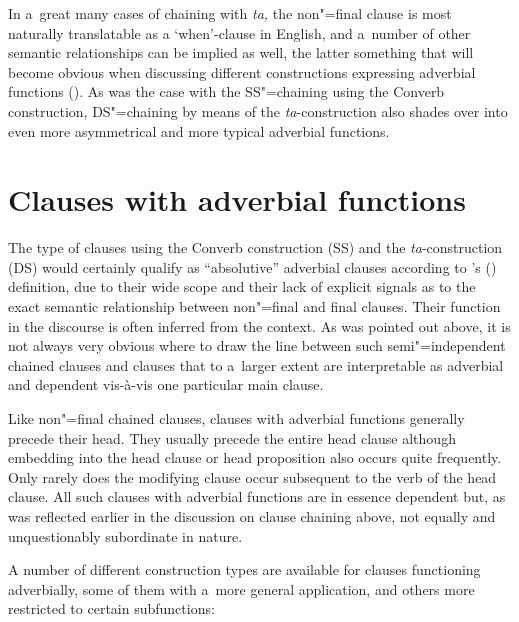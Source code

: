 In a~great many cases of chaining with \textit{ta,} the non"=final clause is most naturally translatable as a `when'-clause in English, and a~number of other semantic relationships can be implied as well, the latter something that will become obvious when discussing different constructions expressing adverbial functions (). As was the case with the SS"=chaining using the Converb construction, DS"=chaining by means of the \textit{ta}-construction also shades over into even more asymmetrical and more typical adverbial functions. 


\section{Clauses with adverbial functions}
\label{sec:13-4}

The type of clauses using the Converb construction (SS) and the \textit{ta}-construction (DS) would certainly qualify as ``absolutive'' adverbial clauses according to \citeauthor{thompsonlongacre1985}'s (\citeyear[200-201]{thompsonlongacre1985}) definition, due to their wide scope and their lack of explicit signals as to the exact semantic relationship between non"=final and final clauses. Their function in the discourse is often inferred from the context. As was pointed out above, it is not always very obvious where to draw the line between such semi"=independent chained clauses and clauses that to a~larger extent are interpretable as adverbial and dependent vis-à-vis one particular main clause. 



Like non"=final chained clauses, clauses with adverbial functions generally precede their head. They usually precede the entire head clause although embedding into the head clause or head proposition also occurs quite frequently. Only rarely does the modifying clause occur subsequent to the verb of the head clause. All such clauses with adverbial functions are in essence dependent but, as was reflected earlier in the discussion on clause chaining above, not equally and unquestionably subordinate in nature. 



A number of different construction types are available for clauses functioning adverbially, some of them with a~more general application, and others more restricted to certain subfunctions:


